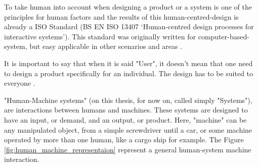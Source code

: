 To take human into account when designing a product or a system is one of the principles for human factors \cite{sandom2004human} and the results of this human-centred-design is already a ISO Standard (BS EN ISO 13407 ‘Human-centred design processes for interactive systems’). This standard was originally written for computer-based-system, but easy applicable in other scenarios and areas \cite{sandom2004human}.

It is important to say that when it is said "User", it doesn't mean that one need to design a product specifically for an individual. The design has to be suited to everyone \cite{dul2003ergonomics}.

"Human-Machine systems" (on this thesis, for now on, called simply "Systems"), are interactions between humans and machines. These systems are designed to have an input, or demand, and an output, or product. Here, "machine" can be any manipulated object, from a simple screwdriver until a car, or some machine operated by more than one human, like a cargo ship for example. The Figure \ref{fig:human_machine_representaion} represent a general human-system machine interaction.

